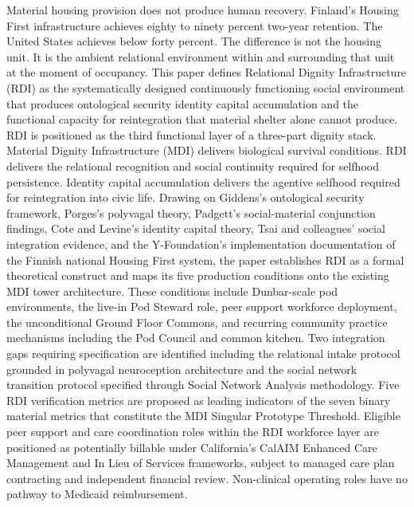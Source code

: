 \documentclass[12pt, letterpaper]{article}
\begin{document}
\begin{titlepage}
\begin{minipage}{0.95\textwidth}
Material housing provision does not produce human recovery. Finland's Housing First infrastructure achieves eighty to ninety percent two-year retention. The United States achieves below forty percent. The difference is not the housing unit. It is the ambient relational environment within and surrounding that unit at the moment of occupancy. This paper defines Relational Dignity Infrastructure (RDI) as the systematically designed continuously functioning social environment that produces ontological security identity capital accumulation and the functional capacity for reintegration that material shelter alone cannot produce. RDI is positioned as the third functional layer of a three-part dignity stack. Material Dignity Infrastructure (MDI) delivers biological survival conditions. RDI delivers the relational recognition and social continuity required for selfhood persistence. Identity capital accumulation delivers the agentive selfhood required for reintegration into civic life. Drawing on Giddens's ontological security framework, Porges's polyvagal theory, Padgett's social-material conjunction findings, Cote and Levine's identity capital theory, Tsai and colleagues' social integration evidence, and the Y-Foundation's implementation documentation of the Finnish national Housing First system, the paper establishes RDI as a formal theoretical construct and maps its five production conditions onto the existing MDI tower architecture. These conditions include Dunbar-scale pod environments, the live-in Pod Steward role, peer support workforce deployment, the unconditional Ground Floor Commons, and recurring community practice mechanisms including the Pod Council and common kitchen. Two integration gaps requiring specification are identified including the relational intake protocol grounded in polyvagal neuroception architecture and the social network transition protocol specified through Social Network Analysis methodology. Five RDI verification metrics are proposed as leading indicators of the seven binary material metrics that constitute the MDI Singular Prototype Threshold. Eligible peer support and care coordination roles within the RDI workforce layer are positioned as potentially billable under California's CalAIM Enhanced Care Management and In Lieu of Services frameworks, subject to managed care plan contracting and independent financial review. Non-clinical operating roles have no pathway to Medicaid reimbursement.

\end{minipage}
\end{titlepage}
\end{document}
